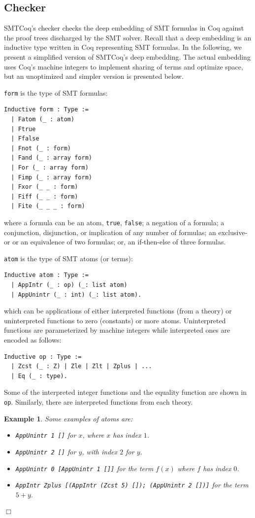 \documentclass[11pt]{article}
\newtheorem{example}{Example}[section]
\begin{document}
	\subsection{Checker}
	\label{sec:checker}
	SMTCoq's checker checks the deep embedding
	of SMT formulas in Coq against the 
	proof trees discharged by the SMT solver.
	Recall that a deep embedding is an
	inductive type written in 
	Coq representing SMT formulas. 
	In the following, we present 
	a simplified version of SMTCoq's 
	deep embedding. The actual embedding 
	uses Coq's machine integers to 
	implement sharing of terms and 
	optimize space, but an unoptimized 
	and simpler version is presented 
	below. 
	
	\medskip
	
	\noindent \texttt{form} is the type of 
	SMT formulas:
	\begin{verbatim}
Inductive form : Type :=
  | Fatom (_ : atom)
  | Ftrue
  | Ffalse
  | Fnot (_ : form)
  | Fand (_ : array form)
  | For (_ : array form)
  | Fimp (_ : array form)
  | Fxor (_ _ : form)
  | Fiff (_ _ : form)
  | Fite (_ _ _ : form)
	\end{verbatim}
	where a formula can be an atom, 
	\texttt{true}, \texttt{false};
	a negation of a formula; a 
	conjunction, disjunction, or 
	implication of any number of
	formulas; an exclusive-or or
	an equivalence of two formulas; 
	or, an if-then-else of three formulas.
	
	\medskip
	
	\noindent \texttt{atom} is the type of SMT atoms
	(or terms):
	\begin{verbatim}
Inductive atom : Type :=
  | AppIntr (_ : op) (_: list atom)
  | AppUnintr (_ : int) (_: list atom).	
	\end{verbatim} 
	which can be applications of 
	either interpreted functions 
	(from a theory) or uninterpreted
	functions to zero (constants) or more 
	atoms. Uninterpreted functions 
	are parameterized by machine 
	integers while interpreted ones 
	are encoded as follows:
	\begin{verbatim}
Inductive op : Type :=
  | Zcst (_ : Z) | Zle | Zlt | Zplus | ...
  | Eq (_ : type).
	\end{verbatim}
	Some of the interpreted integer 
	functions and the equality function 
	are shown in \texttt{op}.
	Similarly, there are interpreted 
	functions from each theory.
	
	\begin{example}
		\label{ex:deepatoms}
		\em Some examples of atoms are:
		\begin{itemize}
			\item \texttt{AppUnintr	1 []} for $x$,
			where $x$ has index $1$.
			\item \texttt{AppUnintr 2 []} for $y$,
			with index $2$ for $y$.
			\item \texttt{AppUnintr 0 [AppUnintr 
				1 []]} for the term $f(x)$ where 
			$f$ has index $0$.
			\item \texttt{AppIntr Zplus [(AppIntr 
				(Zcst 5) []); (AppUnintr 2 [])]} 
			for the term $5 + y$.
		\end{itemize} \hfill $\Box$
	\end{example}
	
\end{document}
